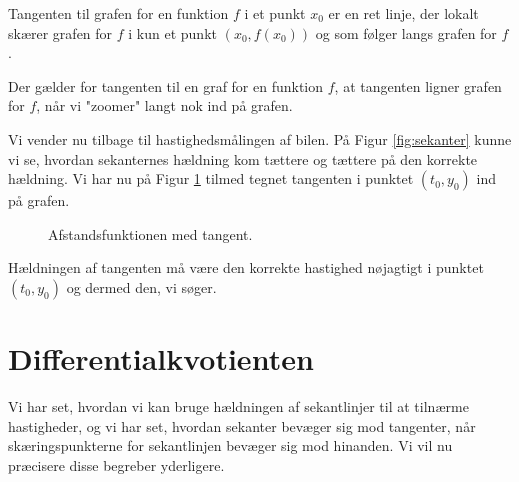 \begin{defn}[Tangentlinje]
	Tangenten til grafen for en funktion $f$ i et punkt $x_0$ er en ret linje, der lokalt skærer grafen for $f$ 
	i kun et punkt $(x_0,f(x_0))$ og som følger langs grafen for $f$. 
\end{defn}
Der gælder for tangenten til en graf for en funktion $f$, at tangenten ligner grafen for $f$, når vi "zoomer" langt nok ind på grafen. 
\begin{exa}
	Vi vender nu tilbage til hastighedsmålingen af bilen. På Figur \ref{fig:sekanter} kunne vi se, hvordan 
	sekanternes hældning kom tættere og tættere på den korrekte hældning. Vi har nu på Figur \ref{fig:tangent}
	tilmed tegnet tangenten i punktet $(t_0,y_0)$ ind på grafen. 
	\begin{figure}[H]
		\centering
		\caption{Afstandsfunktionen med tangent.}
		\label{fig:tangent}
	\end{figure}
	Hældningen af tangenten må være den korrekte hastighed nøjagtigt i punktet $(t_0,y_0)$ og dermed den, vi 
	søger. 
\end{exa}

\section*{Differentialkvotienten}

Vi har set, hvordan vi kan bruge hældningen af sekantlinjer til at tilnærme hastigheder, og vi har set, hvordan
sekanter bevæger sig mod tangenter, når skæringspunkterne for sekantlinjen bevæger sig mod hinanden. Vi vil nu præcisere disse begreber yderligere. 

